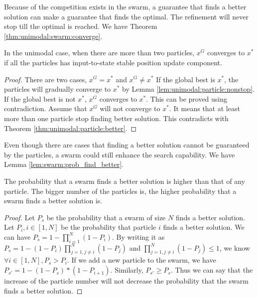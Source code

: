 Because of the competition exists in the swarm, a guarantee that finds a better solution can make a guarantee that finds the optimal.
The refinement will never stop till the optimal is reached.
We have Theorem \ref{thm:unimodal:swarm:converge}.

\begin{mythm}
\label{thm:unimodal:swarm:converge}
In the unimodal case, when there are more than two particles, $ x^{G} $ converges to $ x^{*} $ if all the particles has input-to-state stable position update component.
\begin{proof}
There are two cases, $ x^{G} = x^{*} $ and $ x^{G} \not = x^{*} $
If the global best is $ x^{*} $, the particles will gradually converge to $ x^{*} $ by Lemma \ref{lem:unimodal:particle:nonstop}.
If the global best is not $ x^{*} $, $ x^{G} $ converges to $ x^{*} $.
This can be proved using contradiction.
Assume that $ x^{G} $ will not converge to $ x^{*} $.
It means that at least more than one particle stop finding better solution.
This contradicts with Theorem \ref{thm:unimodal:particle:better}.
\end{proof}
\end{mythm}



Even though there are cases that finding a better solution cannot be guaranteed by the particles, a swarm could still enhance the search capability.
We have Lemma \ref{lem:swarm:prob_find_better}.

\begin{mylem}
\label{lem:swarm:prob_find_better}
The probability that a swarm finds a better solution is higher than that of any particle.
The bigger number of the particles is, the higher probability that a swarm finds a better solution is.
\begin{proof}
Let $ P_{s} $ be the probability that a swarm of size $ N $ finds a better solution.
Let $ P_{i}, i \in [1, N] $ be the probability that particle $ i $ finds a better solution.
We can have  $ P_{s} = 1 - \prod_{i=1}^{N} ( 1 - P_{i} ) $.
By writing it as $ P_{s} = 1 - ( 1 - P_{i} ) \prod_{j=1, j \not = i}^{N}  ( 1 - P_{j} ) $ and $ \prod_{j=1, j \not = i}^{N}  ( 1 - P_{j} ) \leq 1 $, we know $ \forall i \in [1, N], P_{s} > P_{i} $.
If we add a new particle to the swarm, we have
$ P_{s'}  = 1 - (1- P_{s}) *(1-P_{i+1}) $. 
Similarly, $ P_{s'} \geq P_{s} $.
Thus we can say that the increase of the particle number will not decrease the probability that the swarm finds a better solution.
\end{proof}
\end{mylem}

